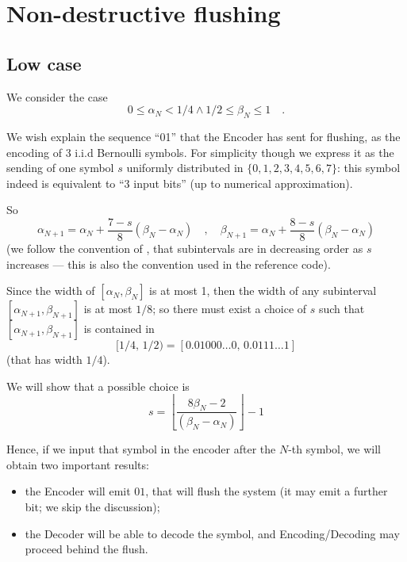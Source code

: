 \documentclass[a4paper,english]{article}
\begin{document}
\section{Non-destructive flushing}

\subsection{Low case}
We consider the case
\[ 0\le \alpha_N< 1/4\land 1/2\le \beta_N\le 1\quad.\]

We wish explain the sequence ``01'' that the Encoder has sent for flushing,
as the encoding of 3 i.i.d Bernoulli symbols.
For simplicity though we express it as the sending of one symbol $s$ uniformly
distributed in $\{0,1,2,3,4,5,6,7\}$: this symbol indeed is equivalent
to ``3 input bits''
(up to numerical approximation).

So
\[\alpha_{N+1}= \alpha_N+\frac{7-s}{8}(\beta_N-\alpha_N)  \quad,\quad
  \beta_{N+1}=\alpha_N+\frac{8-s}{8}(\beta_N-\alpha_N)\]
(we follow the convention of  \cite{witten1987arithmetic}, that
subintervals are in decreasing order as $s$ increases --- this is also
the convention used in the reference code).

Since the width of $[\alpha_N,\beta_N]$ is at most 1,
then the width of any subinterval  $[\alpha_{N+1},\beta_{N+1}]$
is at most $1/8$;
so there must exist a choice of $s$ such that  $[\alpha_{N+1},\beta_{N+1}]$
is contained in 
\[ [1/4, \, 1/2) = [ 0.01000\ldots 0 , \, 0.0111\ldots 1] \]
(that has width $1/4$).

We will show that a possible choice is
\[s = \left\lfloor \frac{8 \beta_N - 2}{(\beta_N-\alpha_N) }\right\rfloor - 1 \]

Hence, if we input that symbol in the encoder after the $N$-th symbol,
we will obtain two important results:
\begin{itemize}
\item the Encoder will emit $01$, that will flush the system
  (it may emit a further bit; we skip the discussion);
\item the Decoder will be able to decode the symbol,
  and Encoding/Decoding may proceed behind the flush.
\end{itemize}
\end{document}
